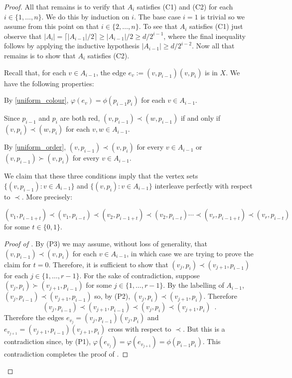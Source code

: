 \documentclass[kpfonts]{patmorin}
\renewcommand{\ge}{\geqslant}
\begin{document}
\begin{proof}
	All that remains is to verify that $A_i$ satisfies (C1) and (C2) for each $i\in\{1,\ldots,n\}$.  We do this by induction on $i$. The base case $i=1$ is trivial so we assume from this point on that $i\in\{2,\ldots,n\}$.   To see that $A_i$ satisfies (C1) just observe that $|A_i|=\lceil |A_{i-1}|/2\rceil \ge |A_{i-1}|/2\ge d/2^{i-1}$, where the final inequality follows by applying the inductive hypothesis $|A_{i-1}|\ge d/2^{i-2}$.  Now all that remains is to show that $A_i$ satisfies (C2).

    Recall that, for each $v\in A_{i-1}$, the edge $e_v:=(v,p_{i-1})(v,p_i)$ is in $X$.  We have the following properties:
    \begin{compactenum}[(P1)]
        \item By \cref{uniform_colour}, $\varphi(e_v)=\phi(p_{i-1}p_i)$ for each $v\in A_{i-1}$.
        \item Since $p_{i-1}$ and $p_i$ are both red, $(v,p_{i-1})\prec (w,p_{i-1})$ if and only if $(v,p_{i})\prec (w,p_{i})$ for each $v,w\in A_{i-1}$.
        \item By \cref{uniform_order}, $(v,p_{i-1})\prec (v,p_i)$ for every $v\in A_{i-1}$ or $(v,p_{i-1})\succ (v,p_i)$ for every $v\in A_{i-1}$.
    \end{compactenum}
    We claim that these three conditions imply that the vertex sets $\{(v,p_{i-1}):v\in A_{i-1}\}$ and $\{(v,p_i):v\in A_{i-1}\}$ interleave perfectly with respect to $\prec$. More precisely:
	\begin{clm} $(v_1,p_{i-1+t})\prec (v_1,p_{i-t}) \prec (v_2,p_{i-1+t}) \prec (v_2,p_{i-t}) \cdots \prec (v_r,p_{i-1+t}) \prec (v_r,p_{i-t})$ for some $t\in\{0,1\}$.
	\end{clm}
	\begin{proof}[Proof of ]
		By (P3) we may assume, without loss of generality, that $(v,p_{i-1})\prec (v,p_i)$ for each $v\in A_{i-1}$, in which case we are trying to prove the claim for $t=0$.  Therefore, it is sufficient to show that $(v_j,p_i)\prec (v_{j+1},p_{i-1})$ for each $j\in\{1,\ldots,r-1\}$.  For the sake of contradiction, suppose $(v_j,p_{i})\succ (v_{j+1},p_{i-1})$ for some $j\in\{1,\ldots,r-1\}$. By the labelling of $A_{i-1}$,  $(v_j,p_{i-1})\prec (v_{j+1},p_{i-1})$ so, by (P2),  $(v_{j},p_i) \prec (v_{j+1},p_i)$.  Therefore
		\[
			(v_j,p_{i-1})\prec (v_{j+1},p_{i-1})\prec(v_{j},p_i) \prec
		   (v_{j+1}, p_i) \enspace .
	   	\]
		Therefore the edges $e_{v_j}=(v_j,p_{i-1})(v_j,p_{i})$ and $e_{v_{j+1}}=(v_{j+1},p_{i-1})(v_{j+1},p_i)$ cross with respect to $\prec$.  But this is a contradiction since, by (P1),  $\varphi(e_{v_j}) =\varphi(e_{v_{j+1}})=\phi(p_{i-1}p_i)$.
		This contradiction completes the proof of .
	\end{proof}


\end{proof}
\end{document}
